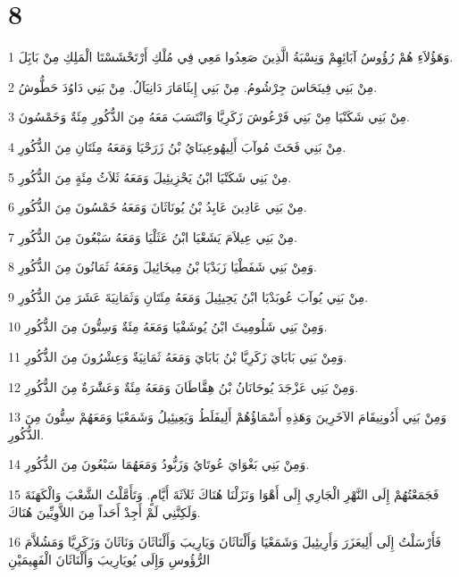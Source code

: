 \chapter{8}

\par 1 وَهَؤُلاَءِ هُمْ رُؤُوسُ آبَائِهِمْ وَنِسْبَةُ الَّذِينَ صَعِدُوا مَعِي فِي مُلْكِ أَرْتَحْشَسْتَا الْمَلِكِ مِنْ بَابَِلَ.
\par 2 مِنْ بَنِي فِينَحَاسَ جِرْشُومُ. مِنْ بَنِي إِيثَامَارَ دَانِيَآلُ. مِنْ بَنِي دَاوُدَ حَطُّوشُ.
\par 3 مِنْ بَنِي شَكَنْيَا مِنْ بَنِي فَرْعُوشَ زَكَرِيَّا وَانْتَسَبَ مَعَهُ مِنَ الذُّكُورِ مِئَةٌ وَخَمْسُونَ.
\par 4 مِنْ بَنِي فَحَثَ مُوآبَ أَلِيهُوعِينَايُ بْنُ زَرَحْيَا وَمَعَهُ مِئَتَانِ مِنَ الذُّكُورِ.
\par 5 مِنْ بَنِي شَكَنْيَا ابْنُ يَحْزِيئِيلَ وَمَعَهُ ثَلاَثُ مِئَةٍ مِنَ الذُّكُورِ.
\par 6 مِنْ بَنِي عَادِينَ عَابِدُ بْنُ يُونَاثَانَ وَمَعَهُ خَمْسُونَ مِنَ الذُّكُورِ.
\par 7 مِنْ بَنِي عِيلاَمَ يَشَعْيَا ابْنُ عَثَلْيَا وَمَعَهُ سَبْعُونَ مِنَ الذُّكُورِ.
\par 8 وَمِنْ بَنِي شَفَطْيَا زَبَدْيَا بْنُ مِيخَائِيلَ وَمَعَهُ ثَمَانُونَ مِنَ الذُّكُورِ.
\par 9 مِنْ بَنِي يُوآبَ عُوبَدْيَا ابْنُ يَحِيئِيلَ وَمَعَهُ مِئَتَانِ وَثَمَانِيَةَ عَشَرَ مِنَ الذُّكُورِ.
\par 10 وَمِنْ بَنِي شَلُومِيثَ ابْنُ يُوشَفْيَا وَمَعَهُ مِئَةٌ وَسِتُّونَ مِنَ الذُّكُورِ.
\par 11 وَمِنْ بَنِي بَابَايَ زَكَرِيَّا بْنُ بَابَايَ وَمَعَهُ ثَمَانِيَةٌ وَعِشْرُونَ مِنَ الذُّكُورِ.
\par 12 وَمِنْ بَنِي عَزْجَدَ يُوحَانَانُ بْنُ هِقَّاطَانَ وَمَعَهُ مِئَةٌ وَعَشَْرَةٌ مِنَ الذُّكُورِ.
\par 13 وَمِنْ بَنِي أَدُونِيقَامَ الآخَرِينَ وَهَذِهِ أَسْمَاؤُهُمْ أَلِيفَلَطُ وَيَعِيئِيلُ وَشَمَعْيَا وَمَعَهُمْ سِتُّونَ مِنَ الذُّكُورِ.
\par 14 وَمِنْ بَنِي بَغْوَايَ عُوتَايُ وَزَبُّودُ وَمَعَهُمَا سَبْعُونَ مِنَ الذُّكُورِ.
\par 15 فَجَمَعْتُهُمْ إِلَى النَّهْرِ الْجَارِي إِلَى أَهْوَا وَنَزَلْنَا هُنَاكَ ثَلاَثَةَ أَيَّامٍ. وَتَأَمَّلْتُ الشَّعْبَ وَالْكَهَنَةَ وَلَكِنَّنِي لَمْ أَجِدْ أَحَداً مِنَ اللاَّوِيِّينَ هُنَاكَ.
\par 16 فَأَرْسَلْتُ إِلَى أَلِيعَزَرَ وَأَرِيئِيلَ وَشَمَعْيَا وَأَلْنَاثَانَ وَيَارِيبَ وَأَلْنَاثَانَ وَنَاثَانَ وَزَكَرِيَّا وَمَشُلاَّمَ الرُّؤُوسِ وَإِلَى يُويَارِيبَ وَأَلْنَاثَانَ الْفَهِيمَيْنِ
